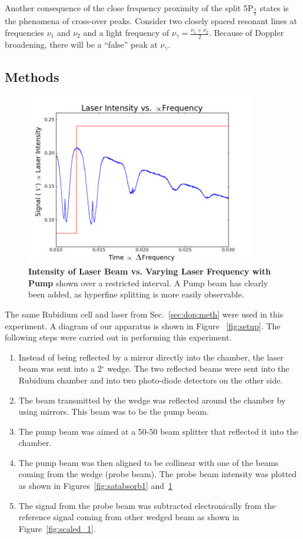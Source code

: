 \documentclass[paper=a4, fontsize=11pt]{scrartcl} %
\numberwithin{equation}{section}
\numberwithin{figure}{section}
\numberwithin{table}{section}
\begin{document}
Another consequence of the close frequency proximity of the split
5P$_{\frac{3}{2}}$ states is the phenomena of cross-over
peaks. Consider two closely spaced resonant lines at frequencies
$\nu_1$ and $\nu_2$ and a light frequency of $\nu_{\gamma} = \frac{\nu_1 +
  \nu_2}{2}$. Because of Doppler broadening, there will be a ``false''
peak at $\nu_{\gamma}$. 


\subsection{Methods}
\label{sec:satabmeth}
\begin{figure}[h] \begin{center}
  \includegraphics[height=75mm]{2-2-002-zoom.png}
  \caption{\textbf{Intensity of Laser Beam vs. Varying Laser Frequency with Pump} shown over a restricted interval. A Pump beam has clearly been added, as hyperfine splitting is more easily observable. }
  \label{fig:withPump_1}
\end{center} \end{figure}
The same Rubidium cell and laser from Sec.~\ref{sec:dop:meth} were
used in this experiment. A diagram of our apparatus is shown in Figure
~\ref{fig:setup}. The following steps were carried out in performing
this experiment. 
\begin{enumerate}
\item Instead of being reflected by a mirror directly into the
  chamber, the laser beam was sent into a 2$^\circ$ wedge. The two reflected beams were sent
  into the Rubidium chamber and into two photo-diode detectors on the
  other side.
\item The beam transmitted by the wedge was reflected around the chamber by using mirrors. This beam was to be the pump beam.
\item The pump beam was aimed at a 50-50 beam
  splitter that reflected it into the chamber.
\item The pump beam was then aligned to be collinear with one of the
  beams coming from the wedge (probe beam). The probe beam intensity was
  plotted as shown in Figures~\ref{fig:satabsorb1} and~\ref{fig:withPump_1}
\item The signal from the probe beam was subtracted electronically
  from the reference signal coming from other wedged beam as shown in Figure~\ref{fig:scaled_1}. 
\end{enumerate}
\end{document}

